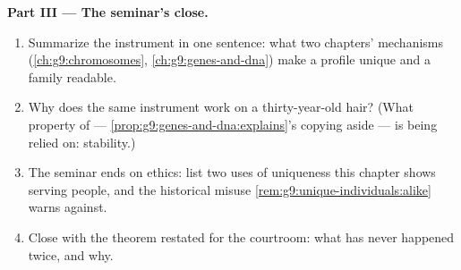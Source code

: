 \begin{problem}
\medskip\noindent\textbf{Part III --- The seminar's
close.}
\begin{enumerate}[resume]
  \item Summarize the instrument in one sentence: what
        two chapters' mechanisms
        (\cref{ch:g9:chromosomes},
        \cref{ch:g9:genes-and-dna}) make a profile
        unique and a family readable.
  \item Why does the same instrument work on a
        thirty-year-old hair? (What property of  ---
        \cref{prop:g9:genes-and-dna:explains}'s copying
        aside --- is being relied on: stability.)
  \item The seminar ends on ethics: list two uses of
        uniqueness this chapter shows serving people,
        and the historical misuse
        \cref{rem:g9:unique-individuals:alike} warns
        against.
  \item Close with the theorem restated for the
        courtroom: what has never happened twice, and
        why.
\end{enumerate}
\end{problem}
